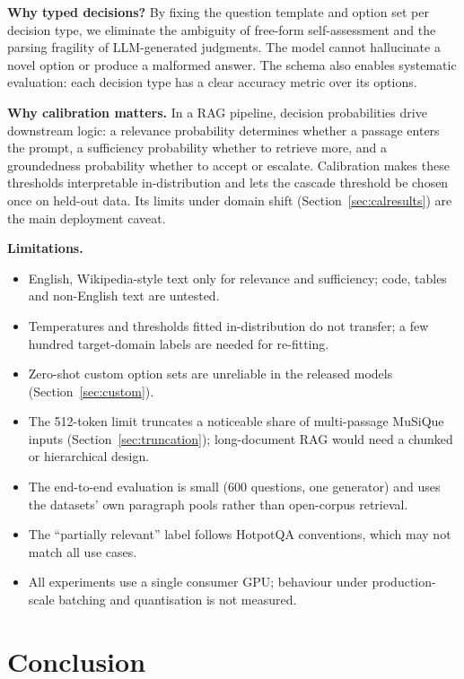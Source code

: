 \documentclass[twocolumn]{ICCKjournal}
\begin{document}
\textbf{Why typed decisions?} By fixing the question template and option set per decision type, we eliminate the ambiguity of free-form self-assessment and the parsing fragility of LLM-generated judgments. The model cannot hallucinate a novel option or produce a malformed answer. The schema also enables systematic evaluation: each decision type has a clear accuracy metric over its options.

\textbf{Why calibration matters.} In a RAG pipeline, decision probabilities drive downstream logic: a relevance probability determines whether a passage enters the prompt, a sufficiency probability whether to retrieve more, and a groundedness probability whether to accept or escalate. Calibration makes these thresholds interpretable in-distribution and lets the cascade threshold be chosen once on held-out data. Its limits under domain shift (Section~\ref{sec:calresults}) are the main deployment caveat.

\textbf{Limitations.}
\begin{itemize}[leftmargin=*]
    \item English, Wikipedia-style text only for relevance and sufficiency; code, tables and non-English text are untested.
    \item Temperatures and thresholds fitted in-distribution do not transfer; a few hundred target-domain labels are needed for re-fitting.
    \item Zero-shot custom option sets are unreliable in the released models (Section~\ref{sec:custom}).
    \item The 512-token limit truncates a noticeable share of multi-passage MuSiQue inputs (Section~\ref{sec:truncation}); long-document RAG would need a chunked or hierarchical design.
    \item The end-to-end evaluation is small (600 questions, one generator) and uses the datasets' own paragraph pools rather than open-corpus retrieval.
    \item The ``partially relevant'' label follows HotpotQA conventions, which may not match all use cases.
    \item All experiments use a single consumer GPU; behaviour under production-scale batching and quantisation is not measured.
\end{itemize}

\section{Conclusion}
\label{sec:conclusion}
\end{document}
